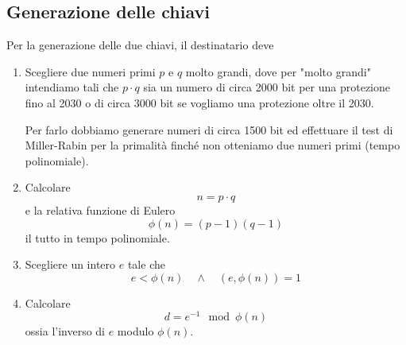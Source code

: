 \subsection{Generazione delle chiavi}
Per la generazione delle due chiavi, il destinatario deve
\begin{enumerate}
	\item Scegliere due numeri primi $p$ e $q$ molto grandi, dove per "molto grandi" intendiamo tali che $p \cdot q$
	      sia un numero di circa 2000 bit per una protezione fino al 2030 o di circa 3000 bit se vogliamo una protezione
	      oltre il 2030.

	      Per farlo dobbiamo generare numeri di circa 1500 bit ed effettuare il test di Miller-Rabin per la primalit\`a
	      finch\'e non otteniamo due numeri primi (tempo polinomiale).
	\item Calcolare
	      \[ n = p \cdot q \]
	      e la relativa funzione di Eulero
	      \[ \phi(n) = (p - 1)(q - 1) \]
	      il tutto in tempo polinomiale.
	\item Scegliere un intero $e$ tale che
	      \[ e < \phi(n) \quad \wedge \quad (e, \phi(n)) = 1 \]
	\item Calcolare
	      \[ d = e^{-1} \mod{\phi(n)} \]
	      ossia l'inverso di $e$ modulo $\phi(n)$.
\end{enumerate}
